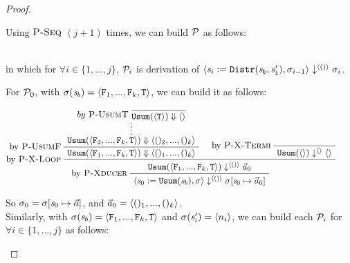\begin{proof}
\begin{itemize}
\begin{enumerate}[(i)]
Using $\textsc{P-Seq}$ $(j+1)$ times, we can build $\mathcal{P}$ as follows:

{\normalsize
{}}\\

 in which for $\forall i \in \{1,...,j\}$, $\mathcal{P}_i$ is derivation of  $\left\langle\mathit{s}_i := \mathtt{Distr(\mathit{s}_b,\mathit{s}_i')},\sigma_{i-1} \right\rangle \downarrow^{\langle () \rangle} \sigma_{i}$.
 

 
  For $\mathcal{P}_0$, with $\sgm(\s_b) = \stwo$, we can build it as follows:
  
    $$\PT{
    	\AC{ \infer*{\blockf{\usum}{\<\F_2,...,\F_k,\T\'>}{\< ()_2,...,()_k\'>}} 
    				{by \ \PName{UsumT} \  \vcenter{\infer {\blockf{\usum}{\singl{\T}}{\emptyv}}{}}}
    		}
    	\LeftLabel{by \PName{UsumF}}
    	\UC{\blockf{\usum}{\stwo}{\kunit}}
    	\AC{}
    	\LeftLabel{by \PName{X-Termi}}
    	\UC{\sevalfg{\usum}{\emptyv}{\emptyv} \emptyv}
    	\LeftLabel{by \PName{X-Loop}}
    	\BC{\sevalfg{\usum}{\stwo}{\vunit}{\a_0}}
    	\LeftLabel{by \PName{Xducer}}
    	\UC{\seval{\usumdef}{\sgm}{\vunit}{\sgm[\s_0 \|-> \a_0]}}
    }$$


    So $\sgm_0 = \sgm[\s_0 \|-> \a]$, and $\vec a_0 = \langle ()_1,...,()_k \rangle$.\\

	Similarly, with  $\sgm(\s_b) = \stwo$ and $\sigma(\mathit{s}_i') = \langle n_i \rangle$, we can build each $\mathcal{P}_i$ for 
	$\forall i \in \{1,...,j\}$ as follows:\\
	
  

\end{enumerate}
\end{itemize}
\end{proof}
